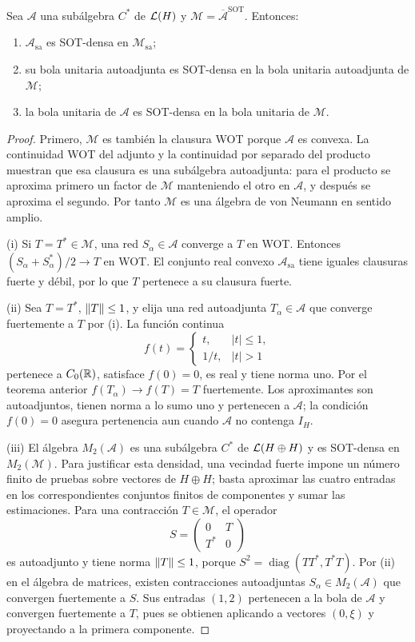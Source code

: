 \begin{teorema}\label{v3:kaplansky}
Sea $\mathcal A$ una subálgebra $C^*$ de $\mathcal L(H)$ y $\mathcal M=\overline{\mathcal A}^{\mathrm{SOT}}$. Entonces:
\begin{enumerate}[label=(\roman*)]
\item $\mathcal A_{\mathrm{sa}}$ es SOT-densa en $\mathcal M_{\mathrm{sa}}$;
\item su bola unitaria autoadjunta es SOT-densa en la bola unitaria autoadjunta de $\mathcal M$;
\item la bola unitaria de $\mathcal A$ es SOT-densa en la bola unitaria de $\mathcal M$.
\end{enumerate}
\end{teorema}
\begin{proof}
Primero, $\mathcal M$ es también la clausura WOT porque $\mathcal A$ es convexa. La continuidad WOT del adjunto y la continuidad por separado del producto muestran que esa clausura es una subálgebra autoadjunta: para el producto se aproxima primero un factor de $\mathcal M$ manteniendo el otro en $\mathcal A$, y después se aproxima el segundo. Por tanto $\mathcal M$ es una álgebra de von Neumann en sentido amplio.

(i) Si $T=T^*\in\mathcal M$, una red $S_\alpha\in\mathcal A$ converge a $T$ en WOT. Entonces $(S_\alpha+S_\alpha^*)/2\to T$ en WOT. El conjunto real convexo $\mathcal A_{\mathrm{sa}}$ tiene iguales clausuras fuerte y débil, por lo que $T$ pertenece a su clausura fuerte.

(ii) Sea $T=T^*$, $\left\lVert T\right\rVert\le1$, y elija una red autoadjunta $T_\alpha\in\mathcal A$ que converge fuertemente a $T$ por (i). La función continua
\[
 f(t)=\begin{cases}t,&|t|\le1,\\1/t,&|t|>1\end{cases}
\]
pertenece a $C_0(\mathbb R)$, satisface $f(0)=0$, es real y tiene norma uno. Por el teorema anterior $f(T_\alpha)\to f(T)=T$ fuertemente. Los aproximantes son autoadjuntos, tienen norma a lo sumo uno y pertenecen a $\mathcal A$; la condición $f(0)=0$ asegura pertenencia aun cuando $\mathcal A$ no contenga $I_H$.

(iii) El álgebra $M_2(\mathcal A)$ es una subálgebra $C^*$ de $\mathcal L(H\oplus H)$ y es SOT-densa en $M_2(\mathcal M)$. Para justificar esta densidad, una vecindad fuerte impone un número finito de pruebas sobre vectores de $H\oplus H$; basta aproximar las cuatro entradas en los correspondientes conjuntos finitos de componentes y sumar las estimaciones. Para una contracción $T\in\mathcal M$, el operador
\[
 S=\begin{pmatrix}0&T\\T^*&0\end{pmatrix}
\]
es autoadjunto y tiene norma $\left\lVert T\right\rVert\le1$, porque $S^2=\operatorname{diag}(TT^*,T^*T)$. Por (ii) en el álgebra de matrices, existen contracciones autoadjuntas $S_\alpha\in M_2(\mathcal A)$ que convergen fuertemente a $S$. Sus entradas $(1,2)$ pertenecen a la bola de $\mathcal A$ y convergen fuertemente a $T$, pues se obtienen aplicando a vectores $(0,\xi)$ y proyectando a la primera componente.
\end{proof}

